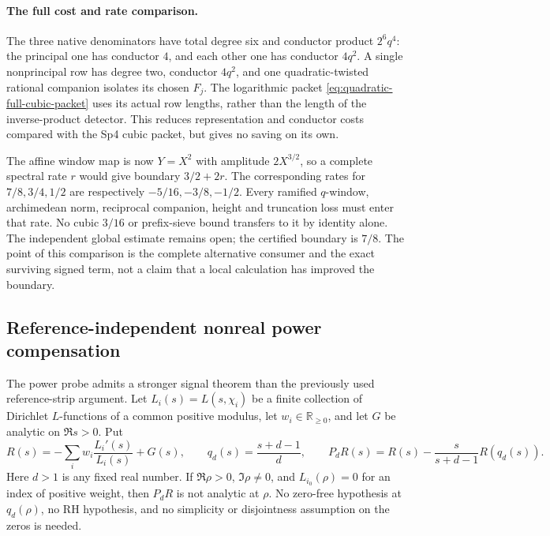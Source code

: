 \paragraph{The full cost and rate comparison.}
The three native denominators have total degree six and conductor
product \(2^6q^4\): the principal one has conductor \(4\),
and each other one has conductor \(4q^2\). A single nonprincipal
row has degree two, conductor \(4q^2\), and one quadratic-twisted
rational companion isolates its chosen \(F_j\). The logarithmic
packet \eqref{eq:quadratic-full-cubic-packet} uses its actual row
lengths, rather than the length of the inverse-product detector.
This reduces representation and conductor costs compared with the
Sp4 cubic packet, but gives no saving on its own.

The affine window map is now \(Y=X^2\) with amplitude \(2X^{3/2}\),
so a complete spectral rate \(r\) would give boundary \(3/2+2r\).
The corresponding rates for \(7/8,3/4,1/2\) are respectively
\(-5/16,-3/8,-1/2\). Every ramified \(q\)-window, archimedean
norm, reciprocal companion, height and truncation loss must enter
that rate. No cubic \(3/16\) or prefix-sieve bound transfers to it
by identity alone. The independent global estimate remains open;
the certified boundary is \(7/8\). The point of this comparison is
the complete alternative consumer and the exact surviving signed
term, not a claim that a local calculation has improved the boundary.

\subsection{Reference-independent nonreal power compensation}
\label{sec:nonreal-power-compensation}

The power probe admits a stronger signal theorem than the previously used
reference-strip argument. Let \(L_i(s)=L(s,\chi_i)\) be a finite collection
of Dirichlet \(L\)-functions of a common positive modulus, let
\(w_i\in\mathbb R_{\ge0}\), and let \(G\) be analytic on
\(\Re s>0\). Put
\[
 R(s)=-\sum_i w_i\frac{L_i'(s)}{L_i(s)}+G(s),\qquad
 q_d(s)=\frac{s+d-1}{d},\qquad
 P_dR(s)=R(s)-\frac{s}{s+d-1}R(q_d(s)).
\]
Here \(d>1\) is any fixed real number. If
\(\Re\rho>0\), \(\Im\rho\ne0\), and \(L_{i_0}(\rho)=0\)
for an index of positive weight, then \(P_dR\) is not analytic at
\(\rho\). No zero-free hypothesis at \(q_d(\rho)\), no RH
hypothesis, and no simplicity or disjointness assumption on the zeros
is needed.

